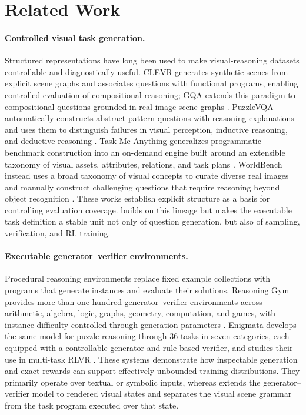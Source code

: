 \section{Related Work}
\label{sec:related}

\paragraph{Controlled visual task generation.}
Structured representations have long been used to make visual-reasoning datasets
controllable and diagnostically useful. CLEVR generates synthetic scenes from
explicit scene graphs and associates questions with functional programs, enabling
controlled evaluation of compositional reasoning; GQA extends this paradigm to
compositional questions grounded in real-image scene graphs
\citep{johnson2017clevr,hudson2019gqa}. PuzzleVQA automatically constructs
abstract-pattern questions with reasoning explanations and uses them to distinguish
failures in visual perception, inductive reasoning, and deductive reasoning
\citep{chia2024puzzlevqa}. Task Me Anything generalizes programmatic benchmark
construction into an on-demand engine built around an extensible taxonomy of
visual assets, attributes, relations, and task plans
\citep{zhang2024taskmeanything}. WorldBench instead uses a broad taxonomy of
visual concepts to curate diverse real images and manually construct challenging
questions that require reasoning beyond object recognition
\citep{yin2026worldbench}. These works establish explicit structure as a basis for
controlling evaluation coverage. \trace builds on this lineage but makes the
executable task definition a stable unit not only of question generation, but also
of sampling, verification, and RL training.

\paragraph{Executable generator--verifier environments.}
Procedural reasoning environments replace fixed example collections with programs
that generate instances and evaluate their solutions. Reasoning Gym provides more
than one hundred generator--verifier environments across arithmetic, algebra,
logic, graphs, geometry, computation, and games, with instance difficulty controlled
through generation parameters \citep{stojanovski2025reasoninggym}. Enigmata
develops the same model for puzzle reasoning through 36 tasks in seven categories,
each equipped with a controllable generator and rule-based verifier, and studies
their use in multi-task RLVR \citep{chen2025enigmata}. These systems demonstrate
how inspectable generation and exact rewards can support effectively unbounded
training distributions. They primarily operate over textual or symbolic inputs,
whereas \trace extends the generator--verifier model to rendered visual states and
separates the visual scene grammar from the task program executed over that state.

